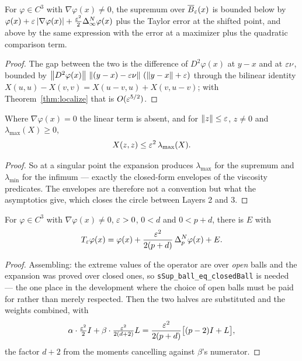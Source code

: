 \begin{theorem}\label{thm:extexp}
\leanok
For $\varphi \in C^3$ with $\nabla\varphi(x) \ne 0$, the supremum over
$\overline{B}_\varepsilon(x)$ is bounded below by
$\varphi(x) + \varepsilon\left\lvert \nabla\varphi(x)\right\rvert
  + \tfrac{\varepsilon^2}{2}\Delta_\infty^{N}\varphi(x)$ plus the Taylor error at the shifted
point, and above by the same expression with the error at a maximizer plus
the quadratic comparison term.
\end{theorem}

\begin{proof}
\leanok
{}
The gap between the two is the difference of $D^2\varphi(x)$ at $y-x$ and at
$\varepsilon\nu$, bounded by $\left\lVert D^2\varphi(x)\right\rVert\,\left\lVert (y-x)-\varepsilon\nu\right\rVert\,
(\left\lVert y-x\right\rVert+\varepsilon)$ through the bilinear identity
$X(u,u) - X(v,v) = X(u-v,u) + X(v,u-v)$; with
Theorem~\ref{thm:localize} that is $O(\varepsilon^{5/2})$.
\end{proof}


\begin{theorem}\label{thm:singexp}
\leanok
Where $\nabla\varphi(x) = 0$ the linear term is absent, and for
$\left\lVert z\right\rVert \le \varepsilon$, $z \ne 0$ and $\lambda_{\max}(X) \ge 0$,
\[
  X(z,z) \le \varepsilon^2\,\lambda_{\max}(X) .
\]
\end{theorem}

\begin{proof}
\leanok
So at a singular point the expansion produces $\lambda_{\max}$ for the
supremum and $\lambda_{\min}$ for the infimum --- exactly the closed-form
envelopes of the viscosity predicates. The envelopes are therefore not a
convention but what the asymptotics give, which closes the circle between
Layers 2 and 3.
\end{proof}


\begin{theorem}\label{thm:opexp}
\leanok
{}
For $\varphi \in C^3$ with $\nabla\varphi(x) \ne 0$, $\varepsilon > 0$, $0 < d$ and
$0 < p + d$, there is $E$ with
\[
  T_\varepsilon\varphi(x) = \varphi(x)
    + \frac{\varepsilon^2}{2(p+d)}\,\Delta_p^{N}\varphi(x) + E .
\]
\end{theorem}

\begin{proof}
\leanok
{}
Assembling: the extreme values of the operator are over \emph{open} balls and
the expansion was proved over closed ones, so
\texttt{sSup\_ball\_eq\_closedBall} is needed --- the one place in the
development where the choice of open balls must be paid for rather than
merely respected. Then the two halves are substituted and the weights
combined, with
\[
  \alpha \cdot \tfrac{\varepsilon^2}{2} I
    + \beta \cdot \tfrac{\varepsilon^2}{2(d+2)} L
  = \frac{\varepsilon^2}{2(p+d)}\bigl[(p-2) I + L\bigr] ,
\]
the factor $d+2$ from the moments cancelling against $\beta$'s numerator.
\end{proof}


